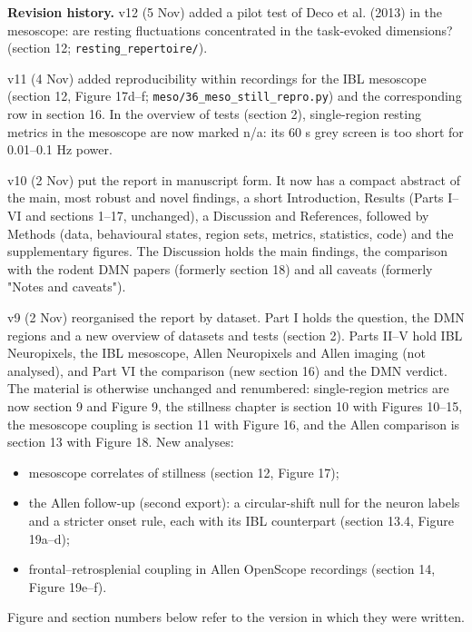 \documentclass[10pt,a4paper]{article}
\begin{document}
\begin{tcolorbox}[breakable,colback=accent!8,colframe=accent,boxrule=0pt,leftrule=2pt,arc=0pt,fontupper=\small]
\textbf{Revision history.} v12 (5 Nov) added a pilot test of Deco et al. (2013) in the mesoscope: are resting fluctuations concentrated in the task-evoked dimensions? (section 12; \texttt{resting\_\allowbreak{}repertoire/\allowbreak{}}).

v11 (4 Nov) added reproducibility within recordings for the IBL mesoscope (section 12, Figure 17d--f; \texttt{meso/\allowbreak{}36\_\allowbreak{}meso\_\allowbreak{}still\_\allowbreak{}repro.py}) and the corresponding row in section 16. In the overview of tests (section 2), single-region resting metrics in the mesoscope are now marked n/a: its 60 s grey screen is too short for 0.01--0.1 Hz power.

v10 (2 Nov) put the report in manuscript form. It now has a compact abstract of the main, most robust and novel findings, a short Introduction, Results (Parts I--VI and sections 1--17, unchanged), a Discussion and References, followed by Methods (data, behavioural states, region sets, metrics, statistics, code) and the supplementary figures. The Discussion holds the main findings, the comparison with the rodent DMN papers (formerly section 18) and all caveats (formerly "Notes and caveats").

v9 (2 Nov) reorganised the report by dataset. Part I holds the question, the DMN regions and a new overview of datasets and tests (section 2). Parts II--V hold IBL Neuropixels, the IBL mesoscope, Allen Neuropixels and Allen imaging (not analysed), and Part VI the comparison (new section 16) and the DMN verdict. The material is otherwise unchanged and renumbered: single-region metrics are now section 9 and Figure 9, the stillness chapter is section 10 with Figures 10--15, the mesoscope coupling is section 11 with Figure 16, and the Allen comparison is section 13 with Figure 18. New analyses:

\begin{itemize}
\item mesoscope correlates of stillness (section 12, Figure 17);
\item the Allen follow-up (second export): a circular-shift null for the neuron labels and a stricter onset rule, each with its IBL counterpart (section 13.4, Figure 19a--d);
\item frontal--retrosplenial coupling in Allen OpenScope recordings (section 14, Figure 19e--f).
\end{itemize}
Figure and section numbers below refer to the version in which they were written.


\end{tcolorbox}
\end{document}

